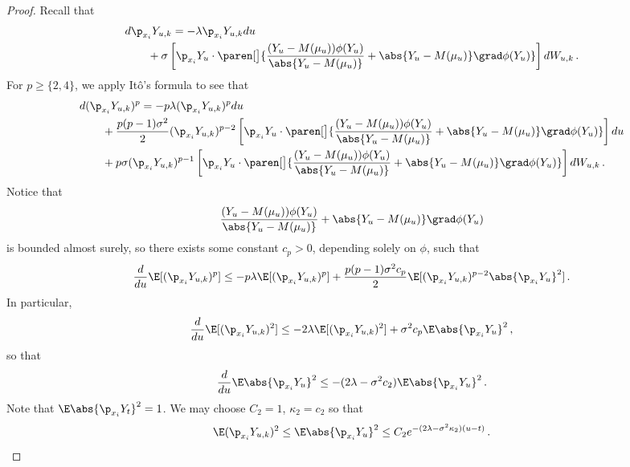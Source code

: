 \documentclass{amsart}
\begin{document}
\begin{proof}
	Recall that  
	\begin{align*}
		& d \p_{x_i} Y_{u,k} = -\lambda \p_{x_i} Y_{u,k} du \\
		& \qquad + \sigma \left[ \p_{x_i} Y_u \cdot \paren[\big]{ \frac{(Y_u - M(\mu_u)) \phi(Y_u)}{\abs{Y_u - M(\mu_u)}} + \abs{Y_u - M(\mu_u)} \grad\phi(Y_u) } \right] dW_{u,k}  \,.
	\end{align*}
	For $p \ge \{2,4\}$, we apply It\^{o}'s formula to see that 
	\begin{align*}
		& d (\p_{x_i} Y_{u,k})^p = -p\lambda (\p_{x_i} Y_{u,k})^p du \\
		& \qquad + \frac{p(p-1) \sigma^2}{2} (\p_{x_i} Y_{u,k})^{p-2} \left[ \p_{x_i} Y_u \cdot \paren[\big]{ \frac{(Y_u - M(\mu_u)) \phi(Y_u)}{\abs{Y_u - M(\mu_u)}} + \abs{Y_u - M(\mu_u)} \grad\phi(Y_u) } \right] du \\
		& \qquad + p\sigma (\p_{x_i} Y_{u,k})^{p-1} \left[ \p_{x_i} Y_u \cdot \paren[\big]{ \frac{(Y_u - M(\mu_u)) \phi(Y_u)}{\abs{Y_u - M(\mu_u)}} + \abs{Y_u - M(\mu_u)} \grad\phi(Y_u) } \right] dW_{u,k} \,.
	\end{align*}
	Notice that 
	\begin{equation*}
		{ \frac{(Y_u - M(\mu_u)) \phi(Y_u)}{\abs{Y_u - M(\mu_u)}} + \abs{Y_u - M(\mu_u)} \grad\phi(Y_u) }
	\end{equation*}
	is bounded almost surely, so there exists some constant $c_p > 0$, depending solely on $\phi$, such that 
	\begin{equation}
		\label{e:ineq-cp}
		\frac{d}{du} \E [(\p_{x_i} Y_{u,k})^p] \le -p\lambda \E[(\p_{x_i} Y_{u,k})^p] + \frac{p(p-1)\sigma^2 c_p}{2} \E [(\p_{x_i} Y_{u,k})^{p-2} \abs{\p_{x_i} Y_u}^2] \,.
	\end{equation}
	In particular, 
	\begin{equation*}
		\frac{d}{du} \E [(\p_{x_i} Y_{u,k})^2] \le -2\lambda \E[(\p_{x_i} Y_{u,k})^2] + \sigma^2 c_p\E \abs{\p_{x_i} Y_u}^2 \,,
	\end{equation*}
	so that 
	\begin{equation*}
		\frac{d}{du} \E \abs{\p_{x_i} Y_u}^2 \le -(2\lambda - \sigma^2 c_2) \E \abs{\p_{x_i} Y_u}^2 \,.
	\end{equation*}
	Note that $\E \abs{\p_{x_i} Y_t}^2 = 1$. 
    We may choose $C_2 = 1$, $\kappa_2 = c_2$ so that 
	\begin{equation*}
		\E (\p_{x_i} Y_{u,k})^2 \le \E \abs{\p_{x_i} Y_u}^2 \le C_2 e^{-(2\lambda - \sigma^2 \kappa_2) (u-t)} \,. 
	\end{equation*}


\end{proof}
\end{document}
